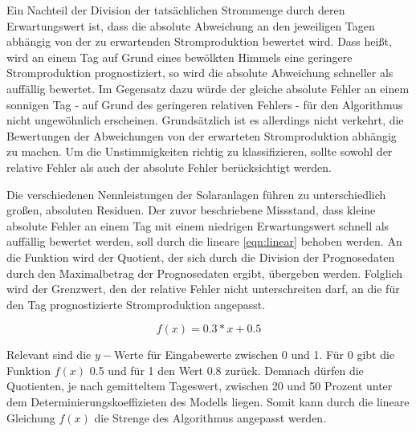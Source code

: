 \documentclass[12pt, a4paper]{article}
\begin{document}
Ein Nachteil der Division der tatsächlichen Strommenge durch deren Erwartungswert ist, dass die absolute Abweichung an den jeweiligen Tagen abhängig von der zu erwartenden Stromproduktion bewertet wird. Dass heißt, wird an einem Tag auf Grund eines bewölkten Himmels eine geringere Stromproduktion prognostiziert, so wird die absolute Abweichung schneller als auffällig bewertet. Im Gegensatz dazu würde der gleiche absolute Fehler an einem sonnigen Tag - auf Grund des geringeren relativen Fehlers - für den Algorithmus nicht ungewöhnlich erscheinen. Grundsätzlich ist es allerdings nicht verkehrt, die Bewertungen der Abweichungen von der erwarteten Stromproduktion abhängig zu machen. Um die Unstimmigkeiten richtig zu klassifizieren, sollte sowohl der relative Fehler als auch der absolute Fehler berücksichtigt werden.  

Die verschiedenen Nennleistungen der Solaranlagen führen zu unterschiedlich großen, absoluten Residuen. Der zuvor beschriebene Missstand, dass kleine absolute Fehler an einem Tag mit einem niedrigen Erwartungswert schnell als auffällig bewertet werden, soll durch die lineare \autoref{eqn:linear} behoben werden. An die Funktion wird der Quotient, der sich durch die Division der Prognosedaten durch den Maximalbetrag der Prognosedaten ergibt, übergeben werden. Folglich wird der Grenzwert, den der relative Fehler nicht unterschreiten darf, an die für den Tag prognostizierte Stromproduktion angepasst.

\begin{equation}
\label{eqn:linear}
f(x)=0.3*x+0.5
\end{equation}

Relevant sind die $y-$Werte für Eingabewerte zwischen 0 und 1. Für 0 gibt die Funktion $f(x)$ 0.5 und für 1 den Wert 0.8 zurück. Demnach dürfen die Quotienten, je nach gemitteltem Tageswert, zwischen 20 und 50 Prozent unter dem Determinierungskoeffizieten des Modells liegen. Somit kann durch die lineare Gleichung $f(x)$ die Strenge des Algorithmus angepasst werden.

\newpage
\end{document}
